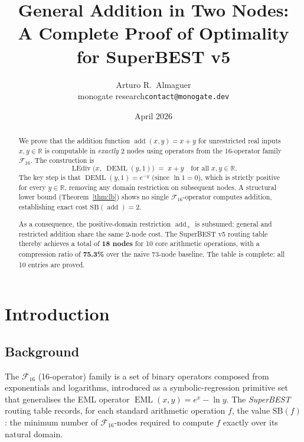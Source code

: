 \documentclass[12pt,a4paper]{article}
\title{General Addition in Two Nodes:\\[4pt]
       A Complete Proof of Optimality for SuperBEST v5}
\author{Arturo R.\ Almaguer\\
  \small monogate research\quad\texttt{contact@monogate.dev}}
\date{April 2026}
\theoremstyle{definition}
\newcommand{\EML}{\operatorname{EML}}
\newcommand{\DEML}{\operatorname{DEML}}
\newcommand{\LEdiv}{\operatorname{LEdiv}}
\newcommand{\addop}{\operatorname{add}}
\newcommand{\SB}{\mathrm{SB}}
\newcommand{\F}{\mathcal{F}_{16}}
\newcommand{\R}{\mathbb{R}}
\begin{document}
\maketitle

\begin{abstract}
We prove that the addition function $\addop(x,y) = x + y$ for unrestricted
real inputs $x, y \in \R$ is computable in \emph{exactly} 2 nodes using
operators from the 16-operator family $\F$.
The construction is
\[
  \LEdiv\!\bigl(x,\;\DEML(y,1)\bigr) \;=\; x + y
  \quad\text{for all }x, y \in \R.
\]
The key step is that $\DEML(y,1) = e^{-y}$ (since $\ln 1 = 0$), which is
strictly positive for every $y \in \R$, removing any domain restriction on
subsequent nodes.
A structural lower bound (Theorem~\ref{thm:lb}) shows no single $\F$-operator
computes addition, establishing exact cost $\SB(\addop) = 2$.

As a consequence, the positive-domain restriction $\addop_+$ is subsumed:
general and restricted addition share the same 2-node cost.
The SuperBEST v5 routing table thereby achieves a total of \textbf{18 nodes}
for 10 core arithmetic operations, with a compression ratio of \textbf{75.3\%}
over the naive 73-node baseline.
The table is complete: all 10 entries are proved.
\end{abstract}

\tableofcontents

\section{Introduction}
\label{sec:intro}

\subsection{Background}

The $\F$ (16-operator) family is a set of binary operators composed from
exponentials and logarithms, introduced as a symbolic-regression primitive set
that generalises the EML operator $\EML(x,y) = e^x - \ln y$.
The \emph{SuperBEST} routing table records, for each standard arithmetic
operation $f$, the value $\SB(f)$: the minimum number of $\F$-nodes required
to compute $f$ exactly over its natural domain.
\end{document}

